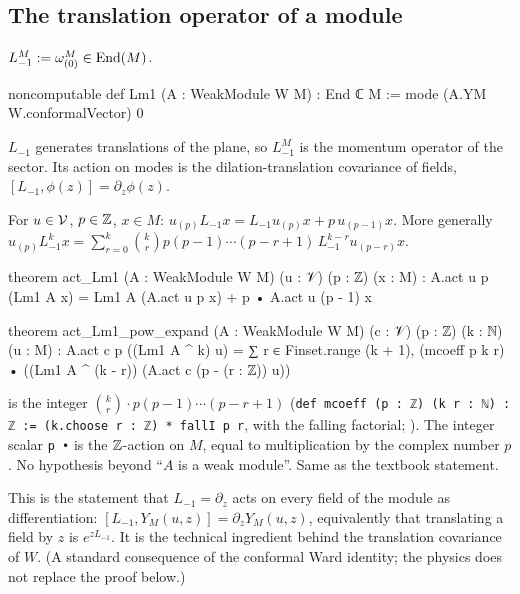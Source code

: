 \subsection{The translation operator of a module}

\begin{definition}\label{ch09:def:Lm1}
$L^M_{-1}:=\omega^M_{(0)}\in\operatorname{End}(M)$.
\end{definition}
\begin{leancode}
noncomputable def Lm1 (A : WeakModule W M) : End ℂ M := mode (A.YM W.conformalVector) 0
\end{leancode}

\begin{physics}
$L_{-1}$ generates translations of the plane, so $L_{-1}^M$ is the momentum operator of the sector. Its action on modes is the dilation-translation covariance of fields, $[L_{-1},\phi(z)]=\partial_z\phi(z)$.
\end{physics}

\begin{proposition}[$L_{-1}$-commutator]\label{ch09:prop:actLm1}
For $u\in\mathcal{V}$, $p\in{\mathbb{Z}}$, $x\in M$:
$u_{(p)}L_{-1}x=L_{-1}u_{(p)}x+p\,u_{(p-1)}x$.
More generally
$u_{(p)}L_{-1}^kx=\sum_{r=0}^{k}\binom{k}{r}p(p-1)\cdots(p-r+1)\,L_{-1}^{k-r}u_{(p-r)}x$.
\end{proposition}
\begin{leancode}
theorem act_Lm1 (A : WeakModule W M) (u : 𝒱) (p : ℤ) (x : M) :
    A.act u p (Lm1 A x) = Lm1 A (A.act u p x) + p • A.act u (p - 1) x

theorem act_Lm1_pow_expand (A : WeakModule W M) (c : 𝒱) (p : ℤ) (k : ℕ) (u : M) :
    A.act c p ((Lm1 A ^ k) u)
      = ∑ r ∈ Finset.range (k + 1),
          (mcoeff p k r) • ((Lm1 A ^ (k - r)) (A.act c (p - (r : ℤ)) u))
\end{leancode}

\begin{dictionary}
 is the integer $\binom{k}{r}\cdot p(p-1)\cdots(p-r+1)$
(\texttt{def mcoeff (p : ℤ) (k r : ℕ) : ℤ := (k.choose r : ℤ) * fallI p r}, with
 the falling factorial; ). The integer scalar
\texttt{p •} is the ${\mathbb{Z}}$-action on $M$, equal to multiplication by the complex number $p$. No
hypothesis beyond ``$A$ is a weak module''. Same as the textbook statement.
\end{dictionary}

\begin{physics}
This is the statement that $L_{-1}=\partial_z$ acts on every field of the module as differentiation: $[L_{-1},Y_M(u,z)]=\partial_zY_M(u,z)$, equivalently that translating a field by $z$ is $e^{zL_{-1}}$. It is the technical ingredient behind the translation covariance of $W$. (A standard consequence of the conformal Ward identity; the physics does not replace the proof below.)
\end{physics}


